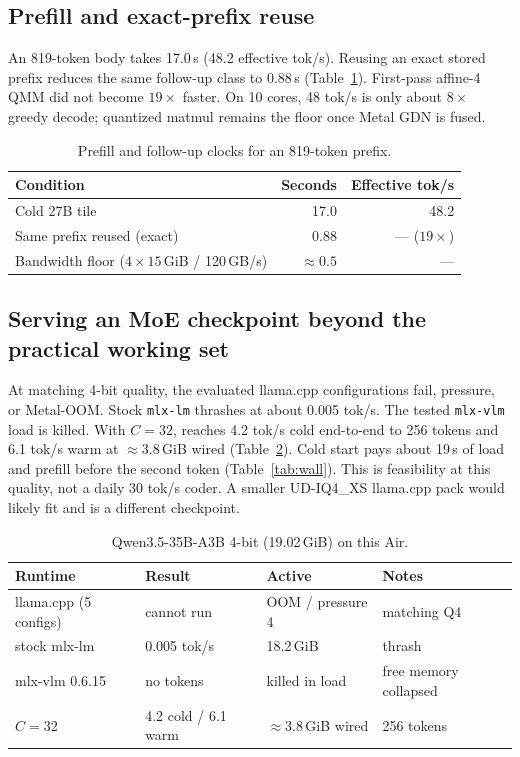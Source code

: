 \subsection{Prefill and exact-prefix reuse}

An 819-token body takes 17.0\,s (48.2 effective tok/s). Reusing an exact stored prefix reduces the same follow-up class to 0.88\,s (Table~\ref{tab:prefill}). First-pass affine-4 QMM did not become $19{\times}$ faster. On 10 cores, 48 tok/s is only about $8{\times}$ greedy decode; quantized matmul remains the floor once Metal GDN is fused.

\begin{table}[t]
\centering
\caption{Prefill and follow-up clocks for an 819-token prefix.}
\label{tab:prefill}
\small
\begin{tabular}{@{}lrr@{}}
\toprule
Condition & Seconds & Effective tok/s \\
\midrule
Cold 27B tile & 17.0 & 48.2 \\
Same prefix reused (exact) & 0.88 & --- ($19{\times}$) \\
Bandwidth floor ($4{\times}15$\,GiB / 120\,GB/s) & ${\approx}0.5$ & --- \\
\bottomrule
\end{tabular}
\end{table}

\subsection{Serving an MoE checkpoint beyond the practical working set}
\label{sec:eval-moe}

At matching 4-bit quality, the evaluated llama.cpp configurations fail, pressure, or Metal-OOM. Stock \texttt{mlx-lm} thrashes at about 0.005 tok/s. The tested \texttt{mlx-vlm} load is killed. With $C{=}32$, \slotbank{} reaches 4.2 tok/s cold end-to-end to 256 tokens and 6.1 tok/s warm at ${\approx}3.8$\,GiB wired (Table~\ref{tab:moe}). Cold start pays about 19\,s of load and prefill before the second token (Table~\ref{tab:wall}). This is feasibility at this quality, not a daily 30 tok/s coder. A smaller UD-IQ4\_XS llama.cpp pack would likely fit and is a different checkpoint.

\begin{table}[t]
\centering
\caption{Qwen3.5-35B-A3B 4-bit (19.02\,GiB) on this Air.}
\label{tab:moe}
\small
\begin{tabular}{@{}llll@{}}
\toprule
Runtime & Result & Active & Notes \\
\midrule
llama.cpp (5 configs) & cannot run & OOM / pressure 4 & matching Q4 \\
stock mlx-lm & 0.005 tok/s & 18.2\,GiB & thrash \\
mlx-vlm 0.6.15 & no tokens & killed in load & free memory collapsed \\
\slotbank{} $C{=}32$ & 4.2 cold / 6.1 warm & ${\approx}3.8$\,GiB wired & 256 tokens \\
\bottomrule
\end{tabular}
\end{table}

